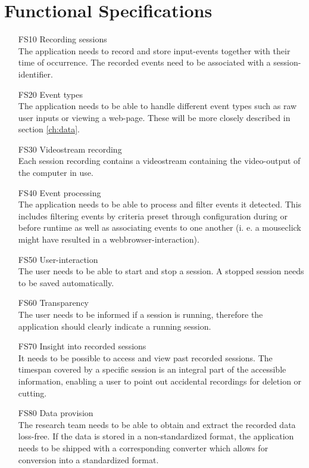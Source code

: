 \chapter{Functional Specifications}
\label{ch:func}

\begin{itemize}
\item[FS10] Recording sessions\\The application needs to record and store input-events together with their time of occurrence. The recorded events need to be associated with a session-identifier. %
\item[FS20] Event types\\The application needs to be able to handle different event types such as raw user inputs or viewing a web-page. These will be more closely described in section \ref{ch:data}. %
\item[FS30] Videostream recording\\Each session recording contains a videostream containing the video-output of the computer in use.
\item[FS40] Event processing\\The application needs to be able to process and filter events it detected. This includes filtering events by criteria preset through configuration during or before runtime as well as associating events to one another (i. e. a mouseclick might have resulted in a webbrowser-interaction). %
\item[FS50] User-interaction\\The user needs to be able to start and stop a session. A stopped session needs to be saved automatically.
\item[FS60] Transparency\\The user needs to be informed if a session is running, therefore the application should clearly indicate a running session.
\item[FS70] Insight into recorded sessions\\It needs to be possible to access and view past recorded sessions. The timespan covered by a specific session is an integral part of the accessible information, enabling a user to point out accidental recordings for deletion or cutting. %
\item[FS80] Data provision\\The research team needs to be able to obtain and extract the recorded data loss-free. If the data is stored in a non-standardized format, the application needs to be shipped with a corresponding converter which allows for conversion into a standardized format.

\end{itemize}
